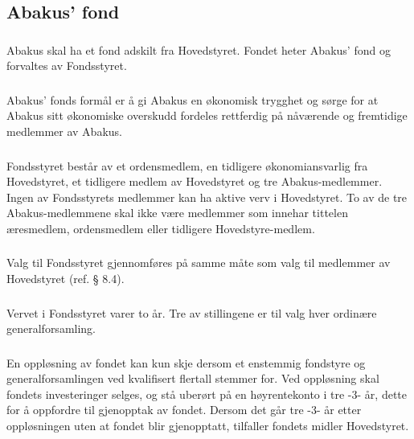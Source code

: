 \subsection{Abakus’ fond}

\subsubsection{}
Abakus skal ha et fond adskilt fra Hovedstyret. Fondet heter Abakus’ fond og forvaltes av Fondsstyret.

\subsubsection{}
Abakus’ fonds formål er å gi Abakus en økonomisk trygghet og sørge for at Abakus sitt
økonomiske overskudd fordeles rettferdig på nåværende og fremtidige medlemmer av Abakus.

\subsubsection{}
Fondsstyret består av et ordensmedlem, en tidligere økonomiansvarlig fra Hovedstyret, et tidligere
medlem av Hovedstyret og tre Abakus-medlemmer. Ingen av Fondsstyrets medlemmer kan ha
aktive verv i Hovedstyret. To av de tre Abakus-medlemmene skal ikke være medlemmer som
innehar tittelen æresmedlem, ordensmedlem eller tidligere Hovedstyre-medlem.

\subsubsection{}
Valg til Fondsstyret gjennomføres på samme måte som valg til medlemmer av Hovedstyret (ref. § 8.4).

\subsubsection{}
Vervet i Fondsstyret varer to år. Tre av stillingene er til valg hver ordinære generalforsamling.

\subsubsection{}
En oppløsning av fondet kan kun skje dersom et enstemmig fondstyre og generalforsamlingen
ved kvalifisert flertall stemmer for. Ved oppløsning skal fondets investeringer selges, og stå
uberørt på en høyrentekonto i tre -3- år, dette for å oppfordre til gjenopptak av fondet. Dersom
det går tre -3- år etter oppløsningen uten at fondet blir gjenopptatt, tilfaller fondets midler
Hovedstyret.

